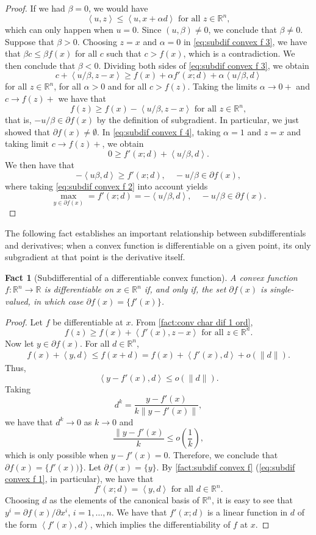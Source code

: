\documentclass[smallextended,numbook,nospthms]{svjour3}
\theoremstyle{plain}
\newtheorem{fact}[theorem]{Fact}
\theoremstyle{definition}
\def\RR{\mathds R}
\newcommand{\scal}[2]{\left\langle{#1},{#2}  \right\rangle}
\begin{document}
\begin{proof}
	If we had $\beta = 0$, we would have
	\[
	\scal{u}{z} \leq \scal{u}{x + \alpha d} \text{ for all } z \in \RR^n,
	\]
	which can only happen when $u=0$. Since $(u,\beta)\not=0$, we conclude that $\beta \not=0$.
	Suppose that $\beta>0$. Choosing $z=x$ and $\alpha=0$ in \cref{eq:subdif convex f 3}, we have that $\beta c \leq \beta f(x)$ for all $c$ such that $c > f(x)$, which is a contradiction. We then conclude that $\beta <0$.
	Dividing both sides of \cref{eq:subdif convex f 3}, we obtain
	\[
	c+\scal{u/\beta}{z-x} \geq f(x) + \alpha f'(x;d)+\alpha\scal{u/\beta}{d} \label{eq:subdif convex f 4}
	\]
	for all $z \in \RR^n$, for all $\alpha > 0$ and for all $c > f(z)$.
	Taking the limits $\alpha \rightarrow 0+$ and $c \rightarrow f(z)+$ we have that
	\[
	f(z) \geq f(x) - \scal{u/\beta}{z-x} \text{ for all } z \in \RR^n,
	\]
	that is, $-u/\beta \in \partial f(x)$ by the definition of subgradient. In particular, we just showed that $\partial f(x) \not= \emptyset$.
	In \cref{eq:subdif convex f 4}, taking $\alpha=1$ and $z=x$ and taking limit $c \rightarrow f(z)+$, we obtain
	\[
	0 \geq f'(x;d) + \scal{u/\beta}{d}.
	\]
	We then have that
	\[
	-\scal{u\beta}{d} \geq f'(x;d), \quad -u/\beta \in \partial f(x),
	\]
	where taking \cref{eq:subdif convex f 2} into account yields
	\[
	\max_{y \in \partial f(x)} = f'(x;d) = -\scal{u/\beta}{d}, \quad -u/\beta \in \partial f(x).
	\]
\end{proof}

The following fact establishes an important relationship between subdifferentials and derivatives; when a convex function is differentiable on a given point, its only subgradient at that point is the derivative itself. 
\begin{fact}[Subdifferential of a differentiable convex function]
	A convex function $f:\RR^n \rightarrow \RR$ is differentiable on $x \in \RR^n$ if, and only if, the set $\partial f(x)$ is single-valued, in which case $\partial f(x)=\{f'(x)\}$.
\end{fact}
\begin{proof}
	Let $f$ be differentiable at $x$. From \cref{fact:conv char dif 1 ord},
	\[
	f(z) \geq f(x) + \scal{f'(x)}{z-x} \text{ for all } z \in \RR^n.
	\]
	Now let $y \in \partial f(x)$. For all $d \in \RR^n$,
	\begin{align}
		f(x) + \scal{y}{d} \leq f(x+d) = f(x) + \scal{f'(x)}{d} + o(\|d\|).
	\end{align}
	Thus,
	\[
	\scal{y-f'(x)}{d}\leq o(\|d\|).
	\]
	Taking
	\[
	d^k = \frac{y-f'(x)}{k\|y-f'(x)\|},
	\]
	we have that $d^k \rightarrow 0$ as $k \rightarrow 0$ and
	\[
	\frac{\|y-f'(x)}{k} \leq o(\frac{1}{k}),
	\]
	which is only possible when $y-f'(x)=0$. Therefore, we conclude that $\partial f(x)=\{f'(x))\}$.	
	Let $\partial f(x)=\{y\}$. By \cref{fact:subdif convex f} (\cref{eq:subdif convex f 1}, in particular), we have that
	\[
	f'(x;d)=\scal{y}{d} \text{ for all } d \in \RR^n.
	\]
	Choosing $d$ as the elements of the canonical basis of $\RR^n$, it is easy to see that $y^i=\partial f(x)/\partial x^i$, $i=1,\ldots,n$. We have that $f'(x;d)$ is a linear function in $d$ of the form $\scal{f'(x)}{d}$, which implies the differentiability of $f$ at $x$. 
\end{proof}
\end{document}
